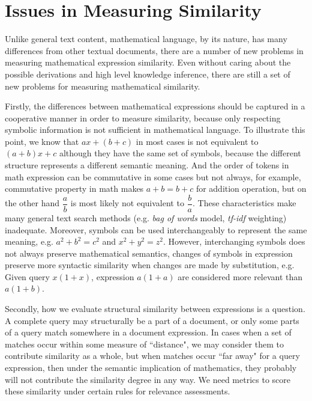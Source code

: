 \section{Issues in Measuring Similarity}
\label{measure_sim}
Unlike general text content, mathematical language, by its nature, has many differences from other textual documents, there are a number of new problems in measuring mathematical expression similarity. 
Even without caring about the possible derivations and high level knowledge inference, there are still a set of new problems for measuring mathematical similarity.

Firstly, the differences between mathematical expressions should be captured in a cooperative manner in order to measure similarity,
because only respecting symbolic information is not sufficient in mathematical language.
To illustrate this point, we know that
$ax+(b+c)$ in most cases is not equivalent to $(a+b)x+c$ although they have the same set of symbols, because the different structure represents a different semantic meaning.
And the order of tokens in math expression can be commutative in some cases but not always, for example, commutative property in math makes $a+b=b+c$ for addition operation, but on the other hand $\dfrac a b$ is most likely not equivalent to $\dfrac b a$.
These characteristics make many general text search methods (e.g. \textit{bag of words} model, \textit{tf-idf} weighting) inadequate.  
Moreover, symbols can be used interchangeably to represent the same meaning, e.g. $a^2+b^2=c^2$ and $x^2+y^2=z^2$. 
However, interchanging symbols does not always preserve mathematical semantics, changes of symbols in expression preserve more syntactic similarity when changes are made by substitution, e.g. Given query $x(1+x)$, expression $a(1+a)$ are considered more relevant than $a(1+b)$. 

Secondly, how we evaluate structural similarity between expressions is a question. A complete query may structurally be a part of a document, or only some parts of a query match somewhere in a document expression.
In cases when a set of matches occur within some measure of ``distance", we may consider them to contribute similarity as a whole, but when matches occur ``far away" for a query expression, then under the semantic implication of mathematics, they probably will not contribute the similarity degree in any way.
We need metrics to score these similarity under certain rules for relevance assessments. 

